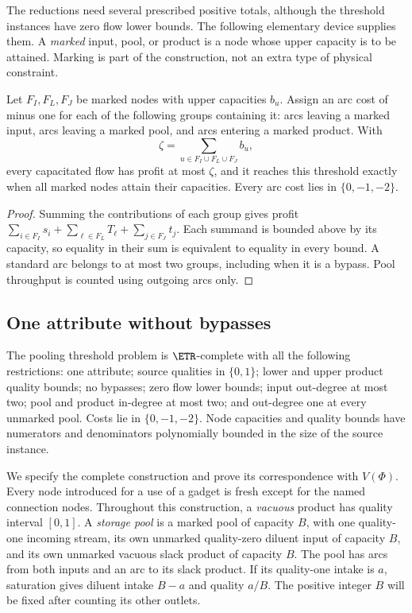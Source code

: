 The reductions need several prescribed positive totals, although the
threshold instances have zero flow lower bounds. The following elementary
device supplies them. A \emph{marked} input, pool, or product is a node
whose upper capacity is to be attained. Marking is part of the construction,
not an extra type of physical constraint.

\begin{lemma}\label{s2:saturation}
Let $F_I,F_L,F_J$ be marked nodes with upper capacities $b_u$.
Assign an arc cost of minus one for each of the following groups
containing it: arcs leaving a marked input, arcs leaving a marked pool,
and arcs entering a marked product. With
\[
 \zeta=\sum_{u\in F_I\cup F_L\cup F_J}b_u,
\]
every capacitated flow has profit at most $\zeta$, and it reaches this
threshold exactly when all marked nodes attain their capacities.
Every arc cost lies in $\{0,-1,-2\}$.
\end{lemma}
\begin{proof}
Summing the contributions of each group gives profit
$\sum_{i\in F_I}s_i+\sum_{\ell\in F_L}T_\ell+
\sum_{j\in F_J}t_j$. Each summand is bounded above by its capacity,
so equality in their sum is equivalent to equality in every bound.
A standard arc belongs to at most two groups, including when it is
a bypass. Pool throughput is counted using outgoing arcs only.
\end{proof}

\subsection{One attribute without bypasses}\label{s2:many-pools}

\begin{theorem}\label{s2:etr-complete}
The pooling threshold problem is $\ETR$-complete with all the following
restrictions: one attribute; source qualities in $\{0,1\}$; lower and upper
product quality bounds; no bypasses; zero flow lower bounds; input
out-degree at most two; pool and product in-degree at most two; and
out-degree one at every unmarked pool. Costs lie in $\{0,-1,-2\}$.
Node capacities and quality bounds have numerators and denominators
polynomially bounded in the size of the source instance.
\end{theorem}

We specify the complete construction and prove its correspondence with
$V(\Phi)$. Every node introduced for a use of a gadget is fresh except
for the named connection nodes. Throughout this construction, a
\emph{vacuous} product has quality interval $[0,1]$. A \emph{storage pool}
is a marked pool of capacity $B$, with one quality-one incoming stream,
its own unmarked quality-zero diluent input of capacity $B$, and its own
unmarked vacuous slack product of capacity $B$. The pool has arcs from
both inputs and an arc to its slack product. If its quality-one intake
is $a$, saturation gives diluent intake $B-a$ and quality $a/B$.
The positive integer $B$ will be fixed after counting its other outlets.

